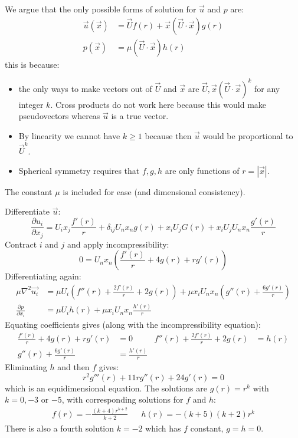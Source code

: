 \documentclass[../Main.tex]{subfiles}
\begin{document}
We argue that the only possible forms of solution for $\vec{u}$ and $p$ are:
\begin{align*}
    \vec u(\vec x)&= \vec U f(r) + \vec x (\vec{U} \cdot \vec{x}) g(r) \\
    p(\vec x) &= \mu (\vec{U} \cdot \vec{x}) h(r)
\end{align*}
this is because:
\begin{itemize}
    \item the only ways to make vectors out of $\vec{U}$ and $\vec{x}$ are $\vec{U}, \vec x(\vec{U} \cdot \vec{x})^k$ for any integer $k$. Cross products do not work here because this would make pseudovectors whereas $\vec u$ is a true vector.
    \item By linearity we cannot have $k \geq 1$ because then $\vec u$ would be proportional to $\vec U^k$.
    \item Spherical symmetry requires that $f, g, h$ are only functions of $r = |\vec x|$.
\end{itemize}

The constant $\mu$ is included for ease (and dimensional consistency).

Differentiate $\vec u$:
\begin{equation}
    \frac{\partial u_i}{\partial x_j} = U_i x_j \frac{f'(r)}{r} + \delta_{ij} U_n x_n g(r) + x_i U_j G(r) + x_i U_j U_n x_n \frac{g'(r)}{r}
    \label{eqnStationSphereDU}
\end{equation}
Contract $i$ and $j$ and apply incompressibility:
\begin{equation*}
    0 = U_n x_n \left(\frac{f'(r)}{r} + 4g(r) + rg'(r)\right)
\end{equation*}
Differentiating again:
\begin{align*}
    \mu \nabla^2 \vec{u_i} &= \mu U_i \left(f''(r) + \frac{2f'(r)}{r} + 2g(r)\right) + \mu x_i U_n x_n \left(g''(r) + \frac{6g'(r)}{r}\right) \\
    \frac{\partial p}{\partial x_i} &= \mu U_i h(r) + \mu x_i U_n x_n \frac{h'(r)}{r}
\end{align*}
Equating coefficients gives (along with the incompressibility equation):
\begin{align*}
    \frac{f'(r)}{r} + 4g(r) + rg'(r) &= 0 & f''(r) + \frac{2f'(r)}{r} + 2g(r) &= h(r)\\
    g''(r) + \frac{6g'(r)}{r} &= \frac{h'(r)}{r}
\end{align*}
Eliminating $h$ and then $f$ gives:
\begin{equation*}
    r^2 g'''(r) + 11rg''(r) + 24g'(r) = 0
\end{equation*}
which is an equidimensional equation. The solutions are $g(r) = r^k$ with $k = 0, -3$ or $-5$, with corresponding solutions for $f$ and $h$:
\begin{align*}
    f(r) = -\frac{(k+4)r^{k+2}}{k+2} && h(r) = -(k+5)(k+2)r^{k}
\end{align*}
There is also a fourth solution $k = -2$ which has $f$ constant, $g = h = 0$.
\end{document}
